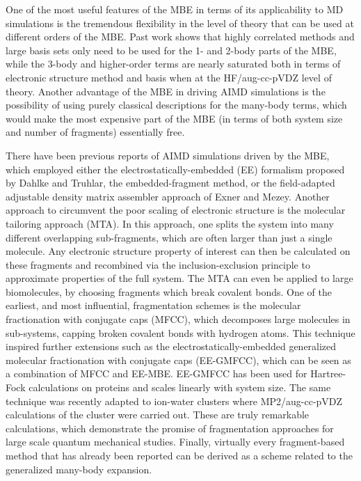 \documentclass[11pt, proquest]{uwthesis}[2020/02/24]
\let\ce\ch
\begin{document}
\par One of the most useful features of the MBE in terms of its applicability to MD simulations is the tremendous flexibility in the level of theory that can be used at different orders of the MBE. Past work shows that highly correlated methods and large basis sets only need to be used for the 1- and 2-body parts of the MBE, while the 3-body and higher-order terms are nearly saturated both in terms of electronic structure method and basis when at the  HF/aug-cc-pVDZ level of theory.\autocite{heindel_many-body_2020} Another advantage of the MBE in driving AIMD simulations is the possibility of using purely classical descriptions for the many-body terms, which would make the most expensive part of the MBE (in terms of both system size and number of fragments) essentially free.

\par There have been previous reports of AIMD simulations driven by the MBE,\autocite{liu_structure_2017,liu_hydrogen-bond_2018,willow_ab_2015,he_second-order_2012} which employed either the electrostatically-embedded (EE) formalism proposed by Dahlke and Truhlar,\autocite{dahlke_electrostatically_2007} the embedded-fragment method,\autocite{willow_ab_2015} or the field-adapted adjustable density matrix assembler approach of Exner and Mezey.\autocite{exner_field-adapted_2004} Another approach to circumvent the poor scaling of electronic structure is the molecular tailoring approach (MTA).\autocite{sahu_molecular_2014} In this approach, one splits the system into many different overlapping sub-fragments, which are often larger than just a single molecule. Any electronic structure property of interest can then be calculated on these fragments and recombined via the inclusion-exclusion principle to approximate properties of the full system. The MTA can even be applied to large biomolecules, by choosing fragments which break covalent bonds.\autocite{ganesh_molecular_2006} One of the earliest, and most influential, fragmentation schemes is the molecular fractionation with conjugate caps (MFCC), which decomposes large molecules in sub-systems, capping broken covalent bonds with hydrogen atoms.\autocite{zhang_molecular_2003,he_new_2005,he_generalized_2006} This technique inspired further extensions such as the electrostatically-embedded generalized molecular fractionation with conjugate caps (EE-GMFCC), which can be seen as a combination of MFCC and EE-MBE. EE-GMFCC has been used for Hartree-Fock calculations on proteins and scales linearly with system size.\autocite{wang_electrostatically_2013} The same technique was recently adapted to ion-water clusters where MP2/aug-cc-pVDZ calculations of the \ce{(H2O)_{43}(Na^+)_6(Cl^-)_6} cluster were carried out.\autocite{liu_fragment_2017} These are truly remarkable calculations, which demonstrate the promise of fragmentation approaches for large scale quantum mechanical studies. Finally, virtually every fragment-based method that has already been reported can be derived as a scheme related to the generalized many-body expansion.\autocite{richard_generalized_2012}
\end{document}
